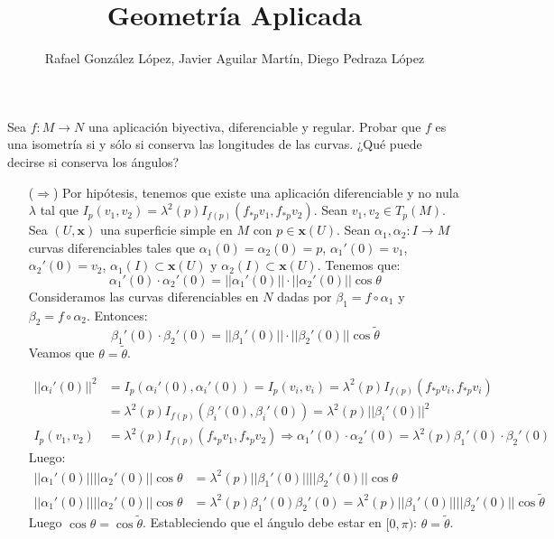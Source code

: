 \documentclass[twoside]{article}
\newcommand{\x}{{\mathbf{x}}}
\begin{document}
\title{Geometría Aplicada}
\author{Rafael González López, Javier Aguilar Martín, Diego Pedraza López}
\maketitle

\begin{ejercicio}{1.1}
Sea $f : M \to N$ una aplicación biyectiva, diferenciable y regular. Probar que $f$ es una isometría si y sólo si conserva las longitudes de las curvas. ¿Qué puede decirse si conserva los ángulos?
\end{ejercicio}
\begin{solucion}
\begin{itemize}
Veamos que $f$ es conforme si y sólo si $f$ conserva los ángulos. 
\item[($\Rightarrow$)] Por hipótesis, tenemos que existe una aplicación diferenciable y no nula $λ$ tal que $I_p(v_1,v_2)=λ^2(p) I_{f(p)}(f_{*p}v_1,f_{*p}v_2)$. Sean $v_1, v_2 \in T_p(M)$. Sea $(U,\x)$ una superficie simple en $M$ con $p \in \x(U)$. Sean $α_1,α_2 : I \to M$ curvas diferenciables tales que $α_1(0)=α_2(0)=p$, $α_1'(0)=v_1$, $α_2'(0)=v_2$, $α_1(I) \subset \x(U)$ y $α_2(I) \subset \x(U)$. Tenemos que:
\[ α_1'(0) \cdot α_2'(0) = ||α_1'(0)|| \cdot ||α_2'(0)|| \cos θ \]
Consideramos las curvas diferenciables en $N$ dadas por $β_1 = f \circ α_1$ y $β_2=f\circ α_2$. Entonces:
\[ β_1'(0)\cdot β_2'(0) = ||β_1'(0)|| \cdot ||β_2'(0)|| \cos \tilde{θ} \]
Veamos que $θ = \tilde{θ}$.

\begin{align*}
	||α_i'(0)||^2 & = I_p(α_i'(0),α_i'(0)) = I_p(v_i,v_i) = λ^2(p) I_{f(p)} (f_{*p}v_i,f_{*p}v_i)\\
	& = λ^2(p) I_{f(p)} (β_i'(0),β_i'(0)) = λ^2(p)||β_i'(0)||^2\\
	I_p(v_1,v_2) & = λ^2(p)I_{f(p)} (f_{*p}v_1,f_{*p}v_2) \Rightarrow α_1'(0) \cdot α_2'(0) = λ^2(p) β_1'(0) \cdot β_2'(0)
\end{align*}
Luego:
\begin{align*}
	||α_1'(0)|| ||α_2'(0)|| \cos θ & = λ^2(p) ||β_1'(0)|| ||β_2'(0)|| \cos θ\\
	||α_1'(0)|| ||α_2'(0)|| \cos θ & = λ^2(p) β_1'(0) β_2'(0) = λ^2(p) ||β_1'(0)|| ||β_2'(0)|| \cos \tilde{θ}
\end{align*}
Luego $\cos θ = \cos \tilde{θ}$. Estableciendo que el ángulo debe estar en $[0,π)$: $θ = \tilde{θ}$.


\end{itemize}
\end{solucion}
\end{document}
